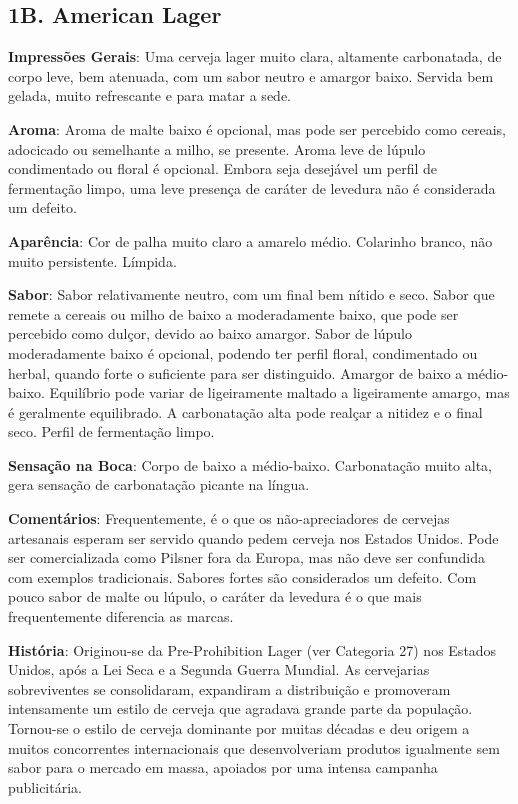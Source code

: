 \subsection*{1B. American Lager}
\textbf{Impressões Gerais}: Uma cerveja lager muito clara, altamente carbonatada, de corpo leve, bem atenuada, com um sabor neutro e amargor baixo. Servida bem gelada, muito refrescante e para matar a sede.

\textbf{Aroma}: Aroma de malte baixo é opcional, mas pode ser percebido como cereais, adocicado ou semelhante a milho, se presente. Aroma leve de lúpulo condimentado ou floral é opcional. Embora seja desejável um perfil de fermentação limpo, uma leve presença de caráter de levedura não é considerada um defeito.

\textbf{Aparência}: Cor de palha muito claro a amarelo médio. Colarinho branco, não muito persistente. Límpida.

\textbf{Sabor}: Sabor relativamente neutro, com um final bem nítido e seco. Sabor que remete a cereais ou milho de baixo a moderadamente baixo, que pode ser percebido como dulçor, devido ao baixo amargor. Sabor de lúpulo moderadamente baixo é opcional, podendo ter perfil floral, condimentado ou herbal, quando forte o suficiente para ser distinguido. Amargor de baixo a médio-baixo. Equilíbrio pode variar de ligeiramente maltado a ligeiramente amargo, mas é geralmente equilibrado. A carbonatação alta pode realçar a nitidez e o final seco. Perfil de fermentação limpo.

\textbf{Sensação na Boca}: Corpo de baixo a médio-baixo. Carbonatação muito alta, gera sensação de carbonatação picante na língua.

\textbf{Comentários}: Frequentemente, é o que os não-apreciadores de cervejas artesanais esperam ser servido quando pedem cerveja nos Estados Unidos. Pode ser comercializada como Pilsner fora da Europa, mas não deve ser confundida com exemplos tradicionais. Sabores fortes são considerados um defeito. Com pouco sabor de malte ou lúpulo, o caráter da levedura é o que mais frequentemente diferencia as marcas.

\textbf{História}: Originou-se da Pre-Prohibition Lager (ver Categoria 27) nos Estados Unidos, após a Lei Seca e a Segunda Guerra Mundial. As cervejarias sobreviventes se consolidaram, expandiram a distribuição e promoveram intensamente um estilo de cerveja que agradava grande parte da população. Tornou-se o estilo de cerveja dominante por muitas décadas e deu origem a muitos concorrentes internacionais que desenvolveriam produtos igualmente sem sabor para o mercado em massa, apoiados por uma intensa campanha publicitária.

